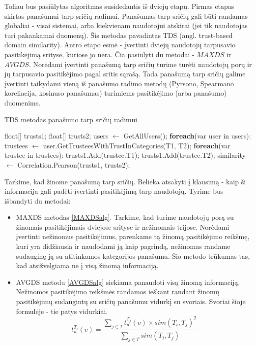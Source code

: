 \documentclass{VUMIFInfMagistrinis}
\begin{document}
\indent 
Toliau bus pasiūlytas algoritmas susidedantis iš dviejų etapų. Pirmas etapas skirtas panašumui tarp sričių radimui. Panašumas tarp sričių gali būti randamas globaliai - visai sistemai, arba kiekvienam naudotojui atskirai (jei tik naudotojas turi pakankamai duomenų). Šis metodas pavadintas TDS (angl. trust-based domain similarity). Antro etapo esmė - įvertinti dviejų naudotojų tarpusavio pasitikėjimą srityse, kuriose jo nėra. Čia pasiūlyti du metodai - $MAXDS$ ir $AVGDS$.
\newline
\indent Norėdami įvertinti panašumą tarp sričių turime turėti naudotojų porų ir jų tarpusavio pasitikėjimo pagal sritis sąrašą. Tada panašumą tarp sričių galime įvertinti taikydami vieną iš panašumo radimo metodų (Pyrsono, Spearmano koreliacija, kosinuso panašumas) turimiems pasitikėjimo (arba panašumo) duomenims. 
\begin{algorithm}
	\caption{TDS metodas panašumo tarp sričių radimui}\label{catsimalg}
	\begin{algorithmic}[1]
		\State float[] trusts1;
		\State float[] trusts2;
		\State users $\gets$ GetAllUsers();
		\State \textbf{foreach}(var user in users):
		\State \indent trustees $\gets$ user.GetTrusteesWithTrustInCategories(T1, T2);
		\State \indent \textbf{foreach}(var trustee in trustees):
		\State \indent \indent trusts1.Add(trustee.T1);
		\State \indent \indent trusts1.Add(trustee.T2);
		\State similarity $\gets$ Correlation.Pearson(trusts1, trusts2);
		\EndProcedure
	\end{algorithmic}
\end{algorithm}

\indent 
Tarkime, kad žinome panašumą tarp sričių. Belieka atsakyti į klausimą - kaip ši informacija gali padėti įvertinti pasitikėjimą tarp naudotojų. Tyrime bus išbandyti du metodai:
\begin{itemize}
	\item MAXDS metodas \ref{MAXDSalg}. Tarkime, kad turime naudotojų porą su žinomais pasitikėjimais dviejose srityse ir nežinomais trijose. Norėdami įvertinti nežinomus pasitikėjimus, parenkame tą žinomą pasitikėjimo reikšmę, kuri yra didžiausia ir naudodami ją kaip pagrindą, nežinomas randame sudauginę ją su atitinkamos kategorijos panašumu. Šio metodo trūkumas tas, kad atsižvelgiama ne į visą žinomą informaciją. 
	\item AVGDS metodu \ref{AVGDSalg} siekiama panaudoti visą žinomą informaciją. Nežinomos pasitikėjimo reikšmės randamos ieškant randant žinomų pasitikėjimų sudaugintų su sričių panašumu vidurkį su svoriais. Svoriai šioje formulėje - tie patys vidurkiai.
	\begin{equation}
	t_u^{T_i}(v) = \frac{\sum\limits_{j \in T } t_u^{T_j}(v) \times sim(T_i, T_j)^2}{\sum\limits_{j \in T} sim(T_i, T_j)}
	\end{equation}
\end{itemize}
\end{document}

